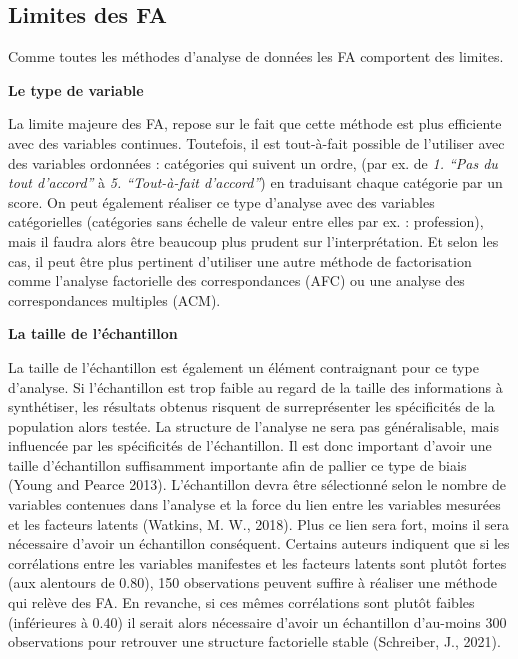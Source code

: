 \documentclass[
  french,
  11pt,
  a4paper,
]{article}
\begin{document}
\subsection{Limites des FA}\label{limites-des-fa}

Comme toutes les méthodes d'analyse de données les FA comportent des
limites.

\textbf{Le type de variable}

La limite majeure des FA, repose sur le fait que cette méthode est plus
efficiente avec des variables continues. Toutefois, il est tout-à-fait
possible de l'utiliser avec des variables ordonnées : catégories qui
suivent un ordre, (par ex. de \emph{1. ``Pas du tout d'accord''} à
\emph{5. ``Tout-à-fait d'accord''}) en traduisant chaque catégorie par
un score. On peut également réaliser ce type d'analyse avec des
variables catégorielles (catégories sans échelle de valeur entre elles
par ex. : profession), mais il faudra alors être beaucoup plus prudent
sur l'interprétation. Et selon les cas, il peut être plus pertinent
d'utiliser une autre méthode de factorisation comme l'analyse
factorielle des correspondances (AFC) ou une analyse des correspondances
multiples (ACM).

\textbf{La taille de l'échantillon}

La taille de l'échantillon est également un élément contraignant pour ce
type d'analyse. Si l'échantillon est trop faible au regard de la taille
des informations à synthétiser, les résultats obtenus risquent de
surreprésenter les spécificités de la population alors testée. La
structure de l'analyse ne sera pas généralisable, mais influencée par
les spécificités de l'échantillon. Il est donc important d'avoir une
taille d'échantillon suffisamment importante afin de pallier ce type de
biais (Young and Pearce 2013). L'échantillon devra être sélectionné
selon le nombre de variables contenues dans l'analyse et la force du
lien entre les variables mesurées et les facteurs latents (Watkins, M.
W., 2018). Plus ce lien sera fort, moins il sera nécessaire d'avoir un
échantillon conséquent. Certains auteurs indiquent que si les
corrélations entre les variables manifestes et les facteurs latents sont
plutôt fortes (aux alentours de 0.80), 150 observations peuvent suffire
à réaliser une méthode qui relève des FA. En revanche, si ces mêmes
corrélations sont plutôt faibles (inférieures à 0.40) il serait alors
nécessaire d'avoir un échantillon d'au-moins 300 observations pour
retrouver une structure factorielle stable (Schreiber, J., 2021).
\end{document}
